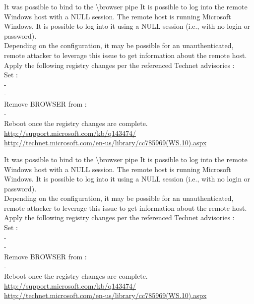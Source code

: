 \begin{tcolorbox}[
	title=Communication is not secure,
	colback=blue!5!white,
	colframe=blue!75!black,
	subtitle style={boxrule=0.4pt, colback=blue!50!white}	
	] 
	It was possible to bind to the \textbackslash browser pipe
It is possible to log into the remote Windows host with a NULL session.
The remote host is running Microsoft Windows. It is possible to log into it using a NULL session (i.e., with no login or password).\\
Depending on the configuration, it may be possible for an unauthenticated, remote attacker to leverage this issue to get information about the remote host.
Apply the following registry changes per the referenced Technet advisories :\\
Set :\\
-\\
-\\
Remove BROWSER from :\\
-\\ 
Reboot once the registry changes are complete.
\url{http://support.microsoft.com/kb/q143474/}\\
\url{http://technet.microsoft.com/en-us/library/cc785969(WS.10).aspx}
\end{tcolorbox}

\begin{tcolorbox}[
	title=Communication is not secure,
	colback=blue!5!white,
	colframe=blue!75!black,
	subtitle style={boxrule=0.4pt, colback=blue!50!white}	
	] 
	It was possible to bind to the \textbackslash browser pipe
It is possible to log into the remote Windows host with a NULL session.
The remote host is running Microsoft Windows. It is possible to log into it using a NULL session (i.e., with no login or password).\\
Depending on the configuration, it may be possible for an unauthenticated, remote attacker to leverage this issue to get information about the remote host.
Apply the following registry changes per the referenced Technet advisories :\\
Set :\\
-\\
-\\
Remove BROWSER from :\\
-\\ 
Reboot once the registry changes are complete.
\url{http://support.microsoft.com/kb/q143474/}\\
\url{http://technet.microsoft.com/en-us/library/cc785969(WS.10).aspx}
\end{tcolorbox}

